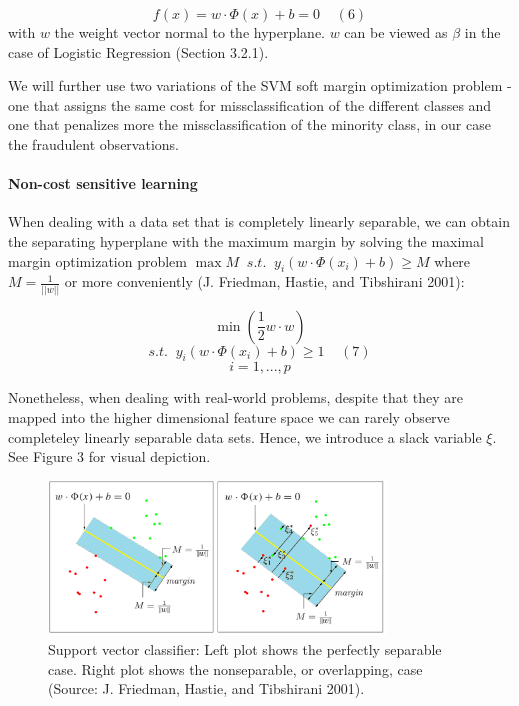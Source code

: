 \documentclass[12pt,]{article}
\let\oldparagraph\paragraph
\renewcommand{\paragraph}[1]{\oldparagraph{#1}\mbox{}}
\begin{document}
\[f(x) = w\cdot\Phi(x)+b=0\;\;\;\;(6)\] with \(w\) the weight vector
normal to the hyperplane. \(w\) can be viewed as \(\beta\) in the case
of Logistic Regression (Section 3.2.1).

We will further use two variations of the SVM soft margin optimization
problem - one that assigns the same cost for missclassification of the
different classes and one that penalizes more the missclassification of
the minority class, in our case the fraudulent observations.

\hypertarget{non-cost-sensitive-learning}{%
\paragraph{Non-cost sensitive
learning}\label{non-cost-sensitive-learning}}

When dealing with a data set that is completely linearly separable, we
can obtain the separating hyperplane with the maximum margin by solving
the maximal margin optimization problem
\(\max M \;\;s.t.\;\;y_i(w \cdot \Phi(x_i) + b) \geq M\) where
\(M=\frac{1}{||w||}\) or more conveniently (J. Friedman, Hastie, and
Tibshirani 2001):

\[\min(\frac{1}{2}w\cdot w)\]
\[s.t. \;\; y_i(w \cdot \Phi(x_i) + b) \geq 1\;\;\;\;(7)\] \[i=1,...,p\]

Nonetheless, when dealing with real-world problems, despite that they
are mapped into the higher dimensional feature space we can rarely
observe completeley linearly separable data sets. Hence, we introduce a
slack variable \(\xi\). See Figure 3 for visual depiction.

\begin{figure}
\centering
\includegraphics[width=0.8\textwidth,height=\textheight]{figures/svm.png}
\caption{Support vector classifier: Left plot shows the perfectly
separable case. Right plot shows the nonseparable, or overlapping, case
(Source: J. Friedman, Hastie, and Tibshirani 2001).}
\end{figure}
\end{document}
